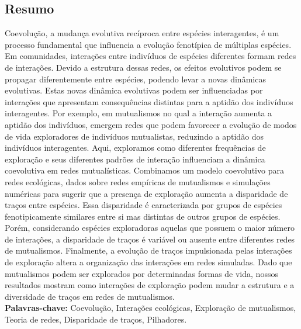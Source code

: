 \documentclass[a4paper, 12pt]{article}
\begin{document}
\subsection*{Resumo}
Coevolução, a mudança evolutiva recíproca entre espécies interagentes, é um processo fundamental que influencia a evolução fenotípica de múltiplas espécies. Em comunidades, interações entre indivíduos de espécies diferentes formam redes de interações. Devido a estrutura dessas redes, os efeitos evolutivos podem se propagar diferentemente entre espécies, podendo levar a novas dinâmicas evolutivas. Estas novas dinâmica evolutivas podem ser influenciadas por interações que apresentam consequências distintas para a aptidão dos indivíduos interagentes. Por exemplo, em mutualismos no qual a interação aumenta a aptidão dos indivíduos, emergem redes que podem favorecer  a evolução de modos de vida exploradores de indivíduos mutualistas, reduzindo a aptidão dos indivíduos interagentes. Aqui, exploramos como diferentes frequências de exploração e seus diferentes padrões de interação influenciam a dinâmica coevolutiva em redes mutualísticas. Combinamos  um modelo coevolutivo para redes ecológicas, dados sobre redes empíricas de mutualismos e simulações numéricas para sugerir que a presença de exploração aumenta a disparidade de traços entre espécies. Essa disparidade é caracterizada por grupos de espécies fenotipicamente similares entre si mas distintas de outros grupos de espécies. Porém, considerando espécies exploradoras aquelas que possuem o maior número de interações, a disparidade de traços é variável ou ausente entre diferentes redes de mutualismos. Finalmente, a evolução de traços impulsionada pelas interações de exploração altera a organização das  interações em redes simuladas. Dado que mutualismos podem ser explorados por determinadas formas de vida, nossos resultados mostram como interações de exploração podem mudar a estrutura e a diversidade de traços em redes de mutualismos. \\ 
\textbf{Palavras-chave:} Coevolução, Interações ecológicas, Exploração de mutualismos, Teoria de redes, Disparidade de traços, Pilhadores.

\newpage

\end{document}
